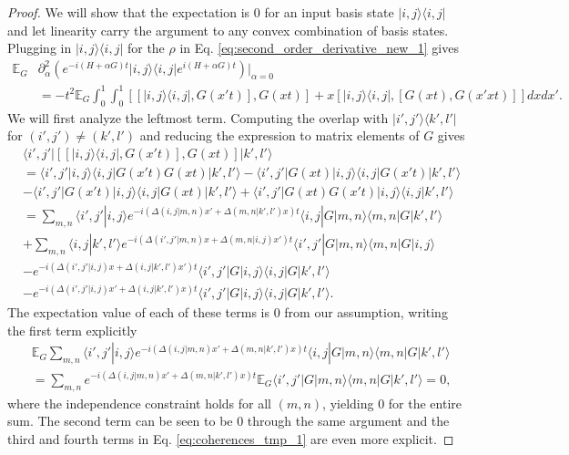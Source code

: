 \documentclass[
 amsmath,amssymb,
 aps,
onecolumn, 
nofootinbib]{revtex4-2}
\newcommand{\ket}[1]{|#1\rangle}
\newcommand{\bra}[1]{\langle #1|}
\newcommand{\braket}[2]{\langle #1|#2\rangle}
\newcommand{\ketbra}[2]{| #1\rangle\! \langle #2|}
\newcommand{\EE}{\mathbb{E}}
\begin{document}
\begin{proof}
    We will show that the expectation is 0 for an input basis state $\ketbra{i,j}{i, j}$ and let linearity carry the argument to any convex combination of basis states. Plugging in $\ketbra{i,j}{i,j}$ for the $\rho$ in Eq. \eqref{eq:second_order_derivative_new_1} gives
\begin{align}
    \EE_G &\partial_\alpha^2 \left(e^{-i (H + \alpha G)t} \ketbra{i,j}{i,j} e^{i (H + \alpha G)t} \right)\bigg|_{\alpha = 0} \nonumber \\
    &= - t^2 \EE_G \int_0^1 \int_0^1 [[\ketbra{i,j}{i,j}, G(x't)], G(xt)] + x [\ketbra{i,j}{i,j}, [G(xt), G(x'xt)]] dx dx'. \label{eq:coherences_tmp_0}
\end{align}
We will first analyze the leftmost term. Computing the overlap with $\ketbra{i', j'}{k',l'}$ for $(i',j') \neq (k',l')$ and reducing the expression to matrix elements of $G$ gives
\begin{align}
    &\bra{i',j'} [[\ketbra{i,j}{i,j}, G(x't)], G(xt)] \ket{k',l'} \\
    &= \braket{i', j'}{i,j} \bra{i,j}G(x't) G(xt) \ket{k',l'} - \bra{i', j'} G(xt) \ket{i,j} \bra{i,j} G(x't) \ket{k',l'} \\
    &- \bra{i',j'} G(x't) \ket{i,j} \bra{i,j} G(xt) \ket{k',l'} + \bra{i', j'} G(xt) G(x't) \ket{i,j} \braket{i,j}{k', l'} \\
    &= \sum_{m, n} \braket{i',j'}{i,j} e^{-i (\Delta(i,j| m,n) x' + \Delta(m,n | k',l')x) t} \bra{i,j}G\ket{m,n} \bra{m,n} G\ket{k',l'} \nonumber \\
    &+\sum_{m,n} \braket{i,j}{k',l'} e^{-i (\Delta(i',j'| m,n)x + \Delta(m,n|i,j) x')t } \bra{i',j'}G \ket{m,n} \bra{m,n} G \ket{i,j} \nonumber \\
    &- e^{-i (\Delta(i',j'|i,j) x + \Delta(i,j|k',l') x' )t } \bra{i',j'} G \ket{i,j} \bra{i,j} G \ket{k', l'} \nonumber \\
    &- e^{-i(\Delta(i', j'| i,j) x' + \Delta(i,j | k', l') x)t} \bra{i',j'}G\ket{i,j} \bra{i,j} G \ket{k', l'}. \label{eq:coherences_tmp_1}
\end{align}
The expectation value of each of these terms is 0 from our assumption, writing the first term explicitly
\begin{align}
    &\EE_G \sum_{m,n} \braket{i',j'}{i,j} e^{-i (\Delta(i,j| m,n) x' + \Delta(m,n | k',l')x) t} \bra{i,j}G\ket{m,n} \bra{m,n} G\ket{k',l'} \\
    &=\sum_{m,n} e^{-i (\Delta(i,j| m,n) x' + \Delta(m,n | k',l')x) t}  \EE_G \bra{i', j'} G \ketbra{m,n}{m,n} G \ket{k', l'} = 0,
\end{align}
where the independence constraint holds for all $(m,n)$, yielding 0 for the entire sum. The second term can be seen to be 0 through the same argument and the third and fourth terms in Eq. \eqref{eq:coherences_tmp_1} are even more explicit. 


\end{proof}
\end{document}
